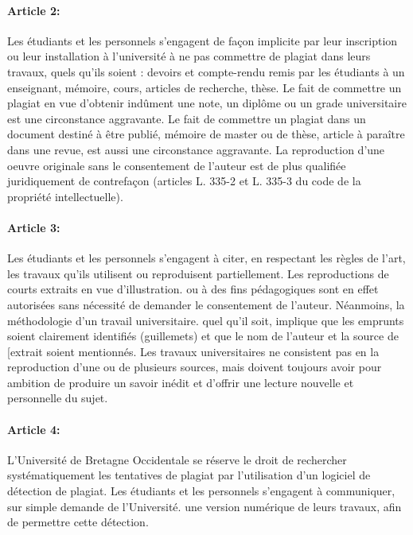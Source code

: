 \documentclass[11pt]{article}
\begin{document}
\begin{multicols*}{2}
\paragraph{Article 2: } Les étudiants et les personnels s'engagent de façon implicite par leur
inscription ou leur installation à l'université à ne pas commettre de plagiat
dans leurs travaux, quels qu'ils soient : devoirs et compte-rendu remis par
les étudiants à un enseignant, mémoire, cours, articles de recherche, thèse.
Le fait de commettre un plagiat en vue d'obtenir indûment une note, un
diplôme ou un grade universitaire est une circonstance aggravante. Le fait
de commettre un plagiat dans un document destiné à être publié, mémoire
de master ou de thèse, article à paraître dans une revue, est aussi une
circonstance aggravante. La reproduction d'une oeuvre originale sans le
consentement de l'auteur est de plus qualifiée juridiquement de
contrefaçon (articles L. 335-2 et L. 335-3 du code de la propriété
intellectuelle).

\paragraph{Article 3: } Les étudiants et les personnels s'engagent à citer, en respectant les règles de l'art, les travaux qu'ils utilisent ou reproduisent partiellement. Les reproductions de courts extraits en vue d'illustration. ou à des fins pédagogiques sont en effet autorisées sans nécessité de demander le consentement de l'auteur. Néanmoins, la méthodologie d'un travail universitaire. quel qu'il soit, implique que les emprunts soient clairement identifiés (guillemets) et que le nom de l'auteur et la source de [extrait soient mentionnés. Les travaux universitaires ne consistent pas en la reproduction d'une ou de plusieurs sources, mais doivent toujours avoir pour ambition de produire un savoir inédit et d'offrir une lecture nouvelle et personnelle du sujet.

\paragraph{Article 4:} L'Université de Bretagne Occidentale se réserve le droit de rechercher systématiquement les tentatives de plagiat par l'utilisation d'un logiciel de détection de plagiat. Les étudiants et les personnels s'engagent à communiquer, sur simple demande de l'Université. une version numérique de leurs travaux, afin de permettre cette détection.


\end{multicols*}
\end{document}
